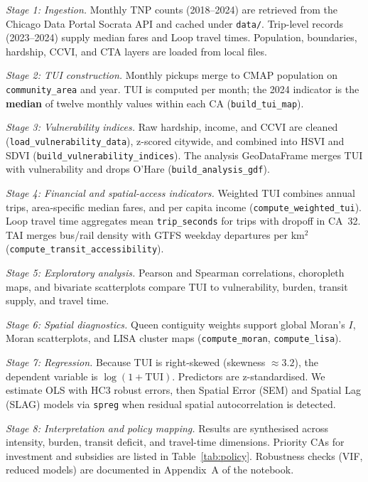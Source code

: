 \documentclass[10pt, a4paper]{article}
\begin{document}
\textit{Stage 1: Ingestion.} Monthly TNP counts (2018--2024) are retrieved from the Chicago Data Portal Socrata API and cached under \texttt{data/}. Trip-level records (2023--2024) supply median fares and Loop travel times. Population, boundaries, hardship, CCVI, and CTA layers are loaded from local files.

\textit{Stage 2: TUI construction.} Monthly pickups merge to CMAP population on \texttt{community\_area} and year. TUI is computed per month; the 2024 indicator is the \textbf{median} of twelve monthly values within each CA (\texttt{build\_tui\_map}).

\textit{Stage 3: Vulnerability indices.} Raw hardship, income, and CCVI are cleaned (\texttt{load\_vulnerability\_data}), z-scored citywide, and combined into HSVI and SDVI (\texttt{build\_vulnerability\_indices}). The analysis GeoDataFrame merges TUI with vulnerability and drops O'Hare (\texttt{build\_analysis\_gdf}).

\textit{Stage 4: Financial and spatial-access indicators.} Weighted TUI combines annual trips, area-specific median fares, and per capita income (\texttt{compute\_weighted\_tui}). Loop travel time aggregates mean \texttt{trip\_seconds} for trips with dropoff in CA~32. TAI merges bus/rail density with GTFS weekday departures per km$^2$ (\texttt{compute\_transit\_accessibility}).

\textit{Stage 5: Exploratory analysis.} Pearson and Spearman correlations, choropleth maps, and bivariate scatterplots compare TUI to vulnerability, burden, transit supply, and travel time.

\textit{Stage 6: Spatial diagnostics.} Queen contiguity weights support global Moran's $I$, Moran scatterplots, and LISA cluster maps (\texttt{compute\_moran}, \texttt{compute\_lisa}).

\textit{Stage 7: Regression.} Because TUI is right-skewed (skewness $\approx 3.2$), the dependent variable is $\log(1+\mathrm{TUI})$. Predictors are z-standardised. We estimate OLS with HC3 robust errors, then Spatial Error (SEM) and Spatial Lag (SLAG) models via \texttt{spreg} when residual spatial autocorrelation is detected.

\textit{Stage 8: Interpretation and policy mapping.} Results are synthesised across intensity, burden, transit deficit, and travel-time dimensions. Priority CAs for investment and subsidies are listed in Table~\ref{tab:policy}. Robustness checks (VIF, reduced models) are documented in Appendix~A of the notebook.
\end{document}
